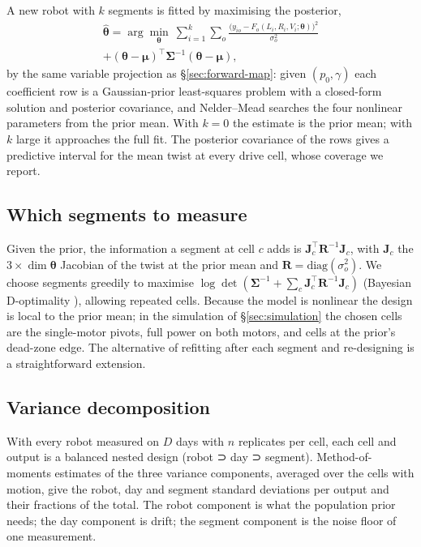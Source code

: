 A new robot with \(k\) segments is fitted by maximising the posterior,
\begin{multline}
\hat{\boldsymbol\theta} = \arg\min_{\boldsymbol\theta}\ \sum_{i=1}^{k} \sum_{o} \frac{\bigl(y_{io} - F_o(L_i,R_i,V_i;\boldsymbol\theta)\bigr)^2}{\sigma_o^2} \\
+ (\boldsymbol\theta-\boldsymbol\mu)^\top \boldsymbol\Sigma^{-1} (\boldsymbol\theta-\boldsymbol\mu),
\label{eq:map}
\end{multline}
by the same variable projection as §\ref{sec:forward-map}: given \((p_0,\gamma)\) each
coefficient row is a Gaussian-prior least-squares problem with a
closed-form solution and posterior covariance, and Nelder--Mead searches
the four nonlinear parameters from the prior mean. With \(k = 0\) the
estimate is the prior mean; with \(k\) large it approaches the full fit.
The posterior covariance of the rows gives a predictive interval for the
mean twist at every drive cell, whose coverage we report.

\subsection{Which segments to
measure}\label{sec:design}

Given the prior, the information a segment at cell \(c\) adds is
\(\mathbf J_c^\top \mathbf R^{-1} \mathbf J_c\), with \(\mathbf J_c\)
the \(3 \times \dim\boldsymbol\theta\) Jacobian of the twist at the
prior mean and \(\mathbf R = \mathrm{diag}(\sigma_o^2)\). We choose
segments greedily to maximise
\(\log\det(\boldsymbol\Sigma^{-1} + \sum_c \mathbf J_c^\top \mathbf R^{-1} \mathbf J_c)\)
(Bayesian D-optimality
\cite{chaloner1995design, sun2008observability}), allowing repeated
cells. Because the model is nonlinear the design is local to the prior
mean; in the simulation of §\ref{sec:simulation} the chosen cells are the single-motor
pivots, full power on both motors, and cells at the prior's dead-zone
edge. The alternative of refitting after each segment and
re-designing \cite{rainforth2024design} is a straightforward extension.

\subsection{Variance decomposition}\label{sec:variance}

With every robot measured on \(D\) days with \(n\) replicates per cell,
each cell and output is a balanced nested design (robot ⊃ day ⊃
segment). Method-of-moments estimates of the three variance components,
averaged over the cells with motion, give the robot, day and segment
standard deviations per output and their fractions of the total. The
robot component is what the population prior needs; the day component is
drift; the segment component is the noise floor of one measurement.

